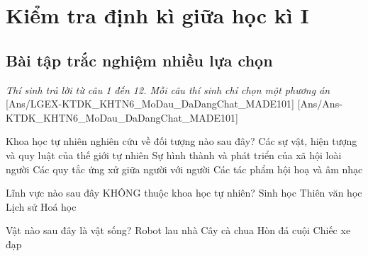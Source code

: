\documentclass[FileMain.tex]{subfiles}
\gdef\made{101} %
\begin{document}
\section[Kiểm tra định kì giữa học kì I Khoa học tự nhiên 6 - Mã đề \made]{Kiểm tra định kì giữa học kì I} %

\subsection{Bài tập trắc nghiệm nhiều lựa chọn}\textit{\large Thí sinh trả lời từ câu 1 đến 12. Mỗi câu thí sinh chỉ chọn một phương án}
[Ans/LGEX-KTDK_KHTN6_MoDau_DaDangChat_MADE101]
[Ans/Ans-KTDK_KHTN6_MoDau_DaDangChat_MADE101]
\begin{ex}%
Khoa học tự nhiên nghiên cứu về đối tượng nào sau đây?
\choice
{\True Các sự vật, hiện tượng và quy luật của thế giới tự nhiên}
{Sự hình thành và phát triển của xã hội loài người}
{Các quy tắc ứng xử giữa người với người}
{Các tác phẩm hội hoạ và âm nhạc}
\end{ex}

\begin{ex}%
Lĩnh vực nào sau đây KHÔNG thuộc khoa học tự nhiên?
\choice
{Sinh học}
{Thiên văn học}
{\True Lịch sử}
{Hoá học}
\end{ex}

\begin{ex}%
Vật nào sau đây là vật sống?
\choice
{Robot lau nhà}
{\True Cây cà chua}
{Hòn đá cuội}
{Chiếc xe đạp}
\end{ex}
\end{document}
